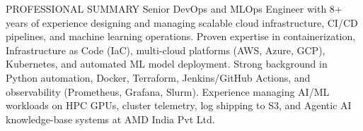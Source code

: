 \documentclass{resume} %
\begin{document}


\begin{rSection}{PROFESSIONAL SUMMARY}
Senior DevOps and MLOps Engineer with 8+ years of experience designing and managing scalable cloud infrastructure, CI/CD pipelines, and machine learning operations. Proven expertise in containerization, Infrastructure as Code (IaC), multi-cloud platforms (AWS, Azure, GCP), Kubernetes, and automated ML model deployment. Strong background in Python automation, Docker, Terraform, Jenkins/GitHub Actions, and observability (Prometheus, Grafana, Slurm). Experience managing AI/ML workloads on HPC GPUs, cluster telemetry, log shipping to S3, and Agentic AI knowledge-base systems at AMD India Pvt Ltd.

\end{rSection}




\end{document}

